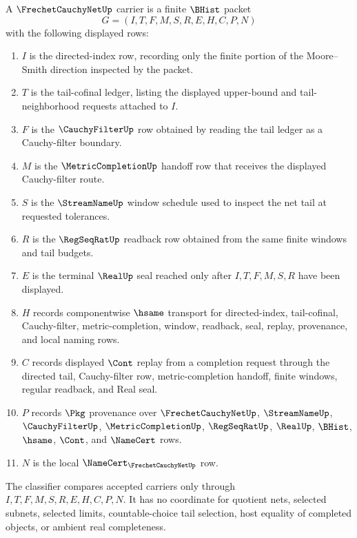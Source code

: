 \begin{definition}
\label{def:frechet-cauchy-net-carrier}
A $\FrechetCauchyNetUp$ carrier is a finite $\BHist$ packet
$$
G=(I,T,F,M,S,R,E,H,C,P,N)
$$
with the following displayed rows:
\begin{enumerate}
\item $I$ is the directed-index row, recording only the finite portion of the Moore--Smith direction inspected by the packet.
\item $T$ is the tail-cofinal ledger, listing the displayed upper-bound and tail-neighborhood requests attached to $I$.
\item $F$ is the $\CauchyFilterUp$ row obtained by reading the tail ledger as a Cauchy-filter boundary.
\item $M$ is the $\MetricCompletionUp$ handoff row that receives the displayed Cauchy-filter route.
\item $S$ is the $\StreamNameUp$ window schedule used to inspect the net tail at requested tolerances.
\item $R$ is the $\RegSeqRatUp$ readback row obtained from the same finite windows and tail budgets.
\item $E$ is the terminal $\RealUp$ seal reached only after $I,T,F,M,S,R$ have been displayed.
\item $H$ records componentwise $\hsame$ transport for directed-index, tail-cofinal, Cauchy-filter, metric-completion, window, readback, seal, replay, provenance, and local naming rows.
\item $C$ records displayed $\Cont$ replay from a completion request through the directed tail, Cauchy-filter row, metric-completion handoff, finite windows, regular readback, and Real seal.
\item $P$ records $\Pkg$ provenance over $\FrechetCauchyNetUp$, $\StreamNameUp$, $\CauchyFilterUp$, $\MetricCompletionUp$, $\RegSeqRatUp$, $\RealUp$, $\BHist$, $\hsame$, $\Cont$, and $\NameCert$ rows.
\item $N$ is the local $\NameCert_{\FrechetCauchyNetUp}$ row.
\end{enumerate}
The classifier compares accepted carriers only through $I,T,F,M,S,R,E,H,C,P,N$. It has no coordinate for quotient nets, selected subnets, selected limits, countable-choice tail selection, host equality of completed objects, or ambient real completeness.
\end{definition}

